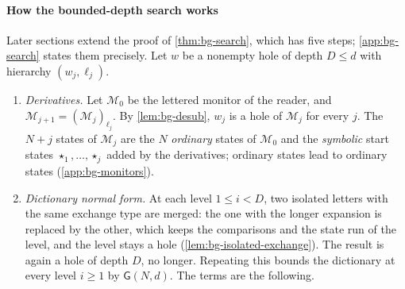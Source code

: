 \paragraph{How the bounded-depth search works}
Later sections extend the proof of \cref{thm:bg-search}, which has five steps;
\cref{app:bg-search} states them precisely. Let $w$ be a nonempty hole of depth
$D\le d$ with hierarchy $(w_j,\ell_j)$.
\begin{enumerate}[leftmargin=*]
\item \emph{Derivatives.} Let $\mathcal M_0$ be the lettered monitor of the
  reader, and $\mathcal M_{j+1}=(\mathcal M_j)_{\ell_j}$. By
  \cref{lem:bg-desub}, $w_j$ is a hole of $\mathcal M_j$ for every $j$. The
  $N+j$ states of $\mathcal M_j$ are the $N$ \emph{ordinary} states of
  $\mathcal M_0$ and the \emph{symbolic} start states $\star_1,\ldots,\star_j$
  added by the derivatives; ordinary states lead to ordinary states
  (\cref{app:bg-monitors}).
\item \emph{Dictionary normal form.} At each level $1\le i<D$, two isolated
  letters with the same exchange type are merged: the one with the longer
  expansion is replaced by the other, which keeps the comparisons and the
  state run of the level, and the level stays a hole
  (\cref{lem:bg-isolated-exchange}). The result is again a hole of depth $D$,
  no longer. Repeating this bounds the dictionary at every level
  $i\ge1$ by $\mathsf G(N,d)$. The terms are the following.
\end{enumerate}
